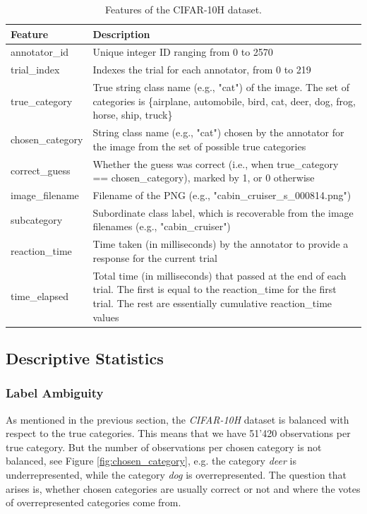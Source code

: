 \begin{table}[H]
  \centering
  \begin{tabular}{p{3.5cm}|p{11.5cm}} \textbf{Feature} & \textbf{Description}
  \\
  \hline
  annotator\_id & Unique integer ID ranging from 0 to 2570\\
  \hline
  trial\_index & Indexes the trial for each annotator, from 0 to 219\\
  \hline
  true\_category & True string class name (e.g., "cat") of the image. The set of
  categories is \{airplane, automobile, bird, cat, deer, dog, frog, horse, ship, truck\}\\
  \hline
  chosen\_category & String class name (e.g., "cat") chosen by the
  annotator for the image from the set of possible true categories\\
  \hline
  correct\_guess & Whether the guess was correct (i.e., when
  true\_category == chosen\_category), marked by 1, or 0 otherwise\\
  \hline
  image\_filename & Filename of the PNG (e.g.,
  "cabin\_cruiser\_s\_000814.png")\\
  \hline
  subcategory & Subordinate class label, which is recoverable from the
  image filenames (e.g., "cabin\_cruiser")\\
  \hline
  reaction\_time & Time taken (in milliseconds) by the annotator to provide a
  response for the current trial\\
  \hline
  time\_elapsed & Total time (in milliseconds) that passed at the end of each
  trial. The first is equal to the reaction\_time for the first trial. The rest
  are essentially cumulative reaction\_time values
  \end{tabular}
  \caption{Features of the CIFAR-10H dataset.}
  \label{tab:cifar10hvariables}
\end{table}



\subsection{Descriptive Statistics}
\subsubsection{Label Ambiguity}
\label{desc_stats}

As mentioned in the previous section, the \textit{CIFAR-10H} dataset is balanced
with respect to the true categories. This means that we have 51'420
observations per true category. But the number of observations per chosen
category is not balanced, see Figure \ref{fig:chosen_category}, e.g. the
category \textit{deer} is underrepresented, while the category \textit{dog} is
overrepresented. The question that arises is, whether chosen categories are
usually correct or not and where the votes of overrepresented categories come
from.

